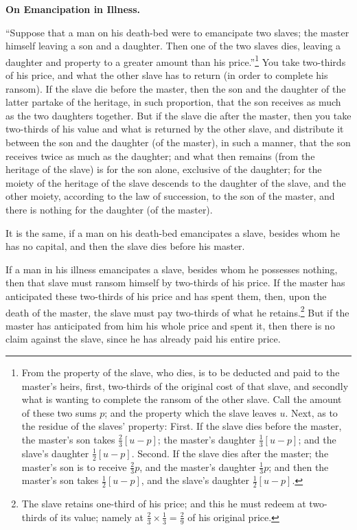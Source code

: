 \vspace{0.3cm}
\noindent\textbf{On Emancipation in Illness.}

``Suppose that a man on his death-bed were to emancipate two slaves; the master himself leaving a son and a daughter. Then one of the two slaves dies, leaving a daughter and property to a greater amount than his price.''\footnote{From the property of the slave, who dies, is to be deducted and paid to the master's heirs, first, two-thirds of the original cost of that slave, and secondly what is wanting to complete the ransom of the other slave. Call the amount of these two sums $p$; and the property which the slave leaves $u$. Next, as to the residue of the slaves' property: First. If the slave dies before the master, the master's son takes $\frac{2}{3}[u-p]$; the master's daughter $\frac{1}{3}[u-p]$; and the slave's daughter $\frac{1}{2}[u-p]$. Second. If the slave dies after the master; the master's son is to receive $\frac{2}{3}p$, and the master's daughter $\frac{1}{3}p$; and then the master's son takes $\frac{1}{2}[u-p]$, and the slave's daughter $\frac{1}{2}[u-p]$.} You take two-thirds of his price, and what the other slave has to return (in order to complete his ransom). If the slave die before the master, then the son and the daughter of the latter partake of the heritage, in such proportion, that the son receives as much as the two daughters together. But if the slave die after the master, then you take two-thirds of his value and what is returned by the other slave, and distribute it between the son and the daughter (of the master), in such a manner, that the son receives twice as much as the daughter; and what then remains (from the heritage of the slave) is for the son alone, exclusive of the daughter; for the moiety of the heritage of the slave descends to the daughter of the slave, and the other moiety, according to the law of succession, to the son of the master, and there is nothing for the daughter (of the master).

It is the same, if a man on his death-bed emancipates a slave, besides whom he has no capital, and then the slave dies before his master.

If a man in his illness emancipates a slave, besides whom he possesses nothing, then that slave must ransom himself by two-thirds of his price. If the master has anticipated these two-thirds of his price and has spent them, then, upon the death of the master, the slave must pay two-thirds of what he retains.\footnote{The slave retains one-third of his price; and this he must redeem at two-thirds of its value; namely at $\frac{2}{3} \times \frac{1}{3} = \frac{2}{9}$ of his original price.} But if the master has anticipated from him his whole price and spent it, then there is no claim against the slave, since he has already paid his entire price.


